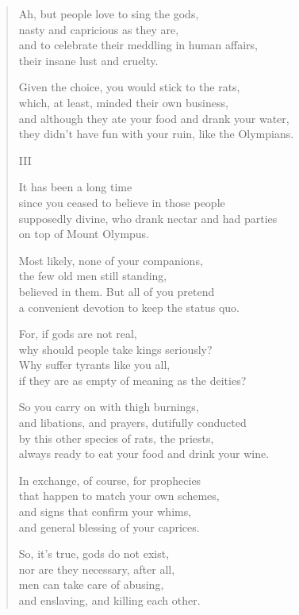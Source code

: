 \documentclass[11pt,a4paper]{article}
\begin{document}
\begin{verse}
Ah, but people love to sing the gods,\\
nasty and capricious as they are,\\
and to celebrate their meddling in human affairs,\\
their insane lust and cruelty.

Given the choice, you would stick to the rats,\\
which, at least, minded their own business,\\
and although they ate your food and drank your water,\\
they didn't have fun with your ruin, like the Olympians.

III

It has been a long time\\
since you ceased to believe in those people\\
supposedly divine, who drank nectar and had parties\\
on top of Mount Olympus.

Most likely, none of your companions,\\
the few old men still standing,\\
believed in them. But all of you pretend\\
a convenient devotion to keep the status quo.

For, if gods are not real,\\
why should people take kings seriously?\\
Why suffer tyrants like you all,\\
if they are as empty of meaning as the deities?

So you carry on with thigh burnings,\\
and libations, and prayers, dutifully conducted\\
by this other species of rats, the priests,\\
always ready to eat your food and drink your wine.

In exchange, of course, for prophecies\\
that happen to match your own schemes,\\
and signs that confirm your whims,\\
and general blessing of your caprices.

So, it's true, gods do not exist,\\
nor are they necessary, after all,\\
men can take care of abusing,\\
and enslaving, and killing each other.


\end{verse}
\end{document}
